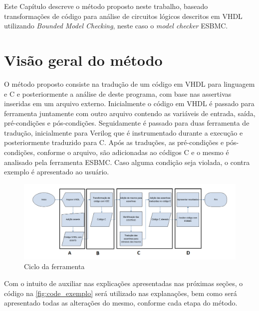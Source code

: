 \label{chapter:metodo}
\par
Este Capítulo descreve o método proposto neste trabalho, baseado transformações de código para análise de circuitos lógicos descritos em VHDL utilizando 
\textit{Bounded Model Checking}, neste caso o \textit{model checker} ESBMC.

\section{Visão geral do método}

\par
O método proposto consiste na tradução de um código em VHDL para linguagem e C e posteriormente a análise de deste programa, com base nas assertivas inseridas em um arquivo externo.  Inicialmente o código em VHDL é passado para ferramenta juntamente com outro arquivo contendo as variáveis de entrada, saída, pré-condições e pós-condições. Seguidamente é passado para duas ferramenta de tradução, inicialmente para Verilog que é instrumentado durante a execução e posteriormente traduzido para C. Após as traduções, as pré-condições e pós-condições, conforme o arquivo, são adicionadas ao códigos C e o mesmo é analisado pela ferramenta ESBMC. Caso alguma condição seja violada, o contra exemplo é apresentado ao usuário.

\begin{figure}[H]
	\begin{center}
    \caption{\label{fig:Fluxo_ferramenta}Ciclo da ferramenta}
	\includegraphics[scale=0.55]{Figuras/Fluxo_ferramenta.png}
	\end{center}
\end{figure}

\par
Com o intuito de auxiliar nas explicações apresentadas nas próximas seções, o código na \autoref{fig:code_exemplo} será utilizado nas explanações, bem como será apresentado todas as alterações do mesmo, conforme cada etapa do método.  

